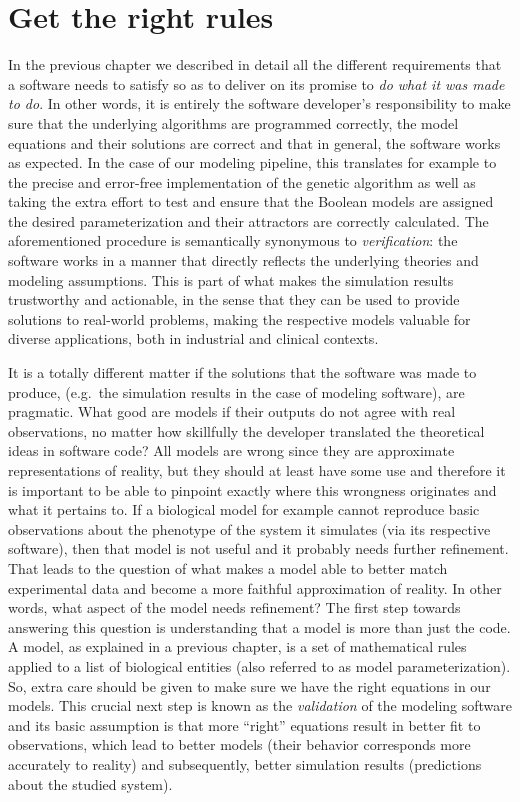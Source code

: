 \documentclass[
  12pt,
]{book}
\begin{document}
\newpage

\hypertarget{gtrr}{%
\section*{Get the right rules}\label{gtrr}}

\indent

In the previous chapter we described in detail all the different requirements that a software needs to satisfy so as to deliver on its promise to \emph{do what it was made to do}.
In other words, it is entirely the software developer's responsibility to make sure that the underlying algorithms are programmed correctly, the model equations and their solutions are correct and that in general, the software works as expected.
In the case of our modeling pipeline, this translates for example to the precise and error-free implementation of the genetic algorithm as well as taking the extra effort to test and ensure that the Boolean models are assigned the desired parameterization and their attractors are correctly calculated.
The aforementioned procedure is semantically synonymous to \emph{verification}: the software works in a manner that directly reflects the underlying theories and modeling assumptions.
This is part of what makes the simulation results trustworthy and actionable, in the sense that they can be used to provide solutions to real-world problems, making the respective models valuable for diverse applications, both in industrial and clinical contexts.

It is a totally different matter if the solutions that the software was made to produce, (e.g.~the simulation results in the case of modeling software), are pragmatic.
What good are models if their outputs do not agree with real observations, no matter how skillfully the developer translated the theoretical ideas in software code?
All models are wrong since they are approximate representations of reality, but they should at least have some use and therefore it is important to be able to pinpoint exactly where this wrongness originates and what it pertains to.
If a biological model for example cannot reproduce basic observations about the phenotype of the system it simulates (via its respective software), then that model is not useful and it probably needs further refinement.
That leads to the question of what makes a model able to better match experimental data and become a more faithful approximation of reality.
In other words, what aspect of the model needs refinement?
The first step towards answering this question is understanding that a model is more than just the code.
A model, as explained in a previous chapter, is a set of mathematical rules applied to a list of biological entities (also referred to as model parameterization).
So, extra care should be given to make sure we have the right equations in our models.
This crucial next step is known as the \emph{validation} of the modeling software and its basic assumption is that more ``right'' equations result in better fit to observations, which lead to better models (their behavior corresponds more accurately to reality) and subsequently, better simulation results (predictions about the studied system).
\end{document}

